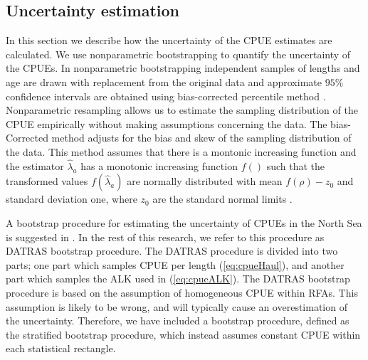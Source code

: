 \documentclass[a4paper 12pt]{article}
\numberwithin{equation}{section}
\begin{document}
\subsection{Uncertainty estimation}
\label{sec:uncertaintyestimation}
In this section we describe how the uncertainty of the CPUE estimates are calculated. We use nonparametric bootstrapping to quantify the uncertainty of the CPUEs. In nonparametric bootstrapping independent samples of lengths and age are drawn with replacement from the original data and approximate $95\%$ confidence intervals are obtained using bias-corrected percentile method  \citep{carpenter2000bootstrap}. Nonparametric resampling allows us to estimate the sampling distribution of the CPUE empirically without making assumptions concerning the data. The bias-Corrected method adjusts for the bias and skew of the sampling distribution of the data. This method assumes that there is a montonic increasing function and the estimator $\hat{\lambda}_{a}$ has a monotonic increasing function $f()$ such that the transformed values $f(\hat{\lambda}_{a})$ are normally distributed with mean $f(\rho) - z_{0}$ and standard deviation one, where $z_{0}$ are the standard normal limits \citep{puth2015variety}.

A bootstrap procedure for estimating the uncertainty of CPUEs in the North Sea is suggested in  \citet{ICES2013}. In the rest of this research, we refer to this procedure as DATRAS bootstrap procedure. The DATRAS procedure is divided into two parts; one part which samples CPUE per length (\ref{eq:cpueHaul}), and another part which samples the ALK used in (\ref{eq:cpueALK}). The DATRAS bootstrap procedure is based on the assumption of homogeneous CPUE within RFAs. This assumption is likely to be wrong, and will typically cause an overestimation of the uncertainty.  Therefore, we have included a bootstrap procedure, defined as the stratified bootstrap procedure, which instead assumes constant CPUE within each statistical rectangle. 
\end{document}
